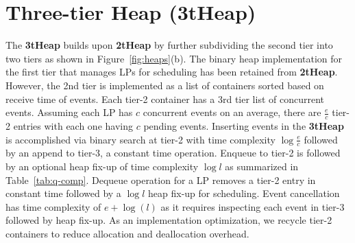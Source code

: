 \section{Three-tier Heap (3tHeap)} 
The \textbf{3tHeap} builds upon \textbf{2tHeap} by further subdividing the second tier into two tiers as shown in Figure~\ref{fig:heaps}(b). The binary heap implementation for the first tier that manages LPs for scheduling has been retained from \textbf{2tHeap}. However, the 2nd tier is implemented as a list of containers sorted based on receive time of events. Each tier-2 container has a 3rd tier list of concurrent events. Assuming each LP has $c$ concurrent events on an average, there are $\frac{e}{c}$ tier-2 entries with each one having $c$ pending events. Inserting events in the \textbf{3tHeap} is accomplished via binary search at tier-2 with time complexity $\log\frac{e}{c}$ followed by an append to tier-3, a constant time operation. Enqueue to tier-2 is followed by an optional heap fix-up of time complexity $\log l$ as summarized in Table~\ref{tab:q-comp}. Dequeue operation for a LP removes a tier-2 entry in constant time followed by a $\log l$ heap fix-up for scheduling. Event cancellation has time complexity of $e + \log(l)$ as it requires inspecting each event in tier-3 followed by heap fix-up. As an implementation optimization, we recycle tier-2 containers to reduce allocation and deallocation overhead.

